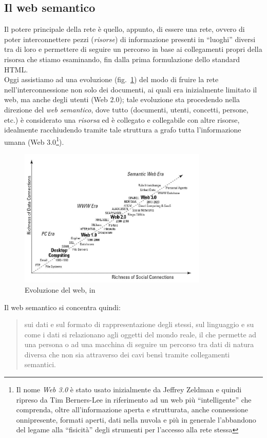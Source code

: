 \subsection{Il web semantico}\label{sec:semantic-web}
Il potere principale della rete è quello, appunto, di essere una rete, ovvero di poter interconnettere pezzi (\emph{risorse}) di informazione presenti in ``luoghi'' diversi tra di loro e permettere di seguire un percorso in base ai collegamenti propri della risorsa che stiamo esaminando, fin dalla prima formulazione dello standard HTML.\\
Oggi assistiamo ad una evoluzione (fig.~\ref{fig:web_evolution}) del modo di fruire la rete nell'interconnessione non solo dei documenti, ai quali era inizialmente limitato il web, ma anche degli utenti (Web 2.0); tale evoluzione sta procedendo nella direzione del \emph{web semantico}, dove tutto (documenti, utenti, concetti, persone, etc.) è considerato una \emph{risorsa} ed è collegato e collegabile con altre risorse, idealmente racchiudendo tramite tale struttura a grafo tutta l'informazione umana (Web 3.0\footnote{Il nome \emph{Web 3.0} è stato usato inizialmente da Jeffrey Zeldman \cite{30} e quindi ripreso da Tim Berners-Lee \cite{31} in riferimento ad un web più ``intelligente'' che comprenda, oltre all'informazione aperta e strutturata, anche connessione onnipresente, formati aperti, dati nella nuvola e più in generale l'abbandono del legame alla ``fisicità'' degli strumenti per l'accesso alla rete stessa}).

\begin{figure}[ht!]
	\centering
	\includegraphics[width=90mm]{images/Four-major-waves-of-Web-evolution.jpg}
	\caption{Evoluzione del web, in \cite{1}}
	\label{fig:web_evolution}
\end{figure}

Il web semantico si concentra quindi:
\begin{quote}
sui dati e sul formato di rappresentazione degli stessi, sul linguaggio e su come i dati si relazionano agli oggetti del mondo reale, il che permette ad una persona o ad una macchina di seguire un percorso tra dati di natura diversa che non sia attraverso dei cavi bensì tramite collegamenti semantici.\cite{2}
\end{quote}

